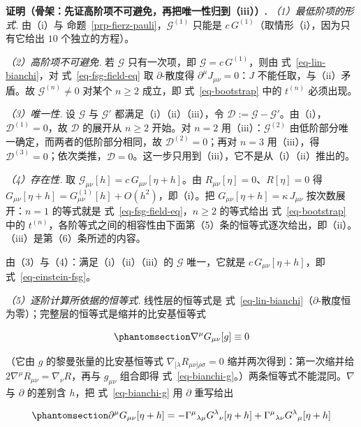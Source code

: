 \documentclass[
  chinese,
  a4paper,
  UTF8,
  12pt,
  oneside,
  openany]{ctexbook}
\theoremstyle{plain}
\theoremstyle{plain}
\theoremstyle{plain}
\theoremstyle{definition}
\theoremstyle{plain}
\theoremstyle{plain}
\theoremstyle{remark}
\begin{document}
\textbf{证明（骨架：先证高阶项不可避免，再把唯一性归到（iii））.}
\emph{（1）最低阶项的形式.} 由（i）与
命题~\ref{prp-fierz-pauli}，\(\mathcal{G}^{(1)}\) 只能是
\(c\,G^{(1)}\)（取情形（i），因为只有它给出 \(10\) 个独立的方程）。

\emph{（2）高阶项不可避免.} 若 \(\mathcal{G}\) 只有一次项，即
\(\mathcal{G}=c\,G^{(1)}\)，则由 式~\ref{eq-lin-bianchi}，对
式~\ref{eq-fsg-field-eq} 取 \(\partial\)-散度得
\(\partial^{\mu}J_{\mu\nu}=0\)：\(J\) 不能任取，与（ii）矛盾。故
\(\mathcal{G}^{(n)}\neq0\) 对某个 \(n\ge2\) 成立，即
式~\ref{eq-bootstrap} 中的 \(t^{(n)}\) 必须出现。

\emph{（3）唯一性.} 设 \(\mathcal{G}\) 与 \(\mathcal{G}'\)
都满足（i）（ii）（iii），令
\(\mathcal{D}:=\mathcal{G}-\mathcal{G}'\)。由（i），\(\mathcal{D}^{(1)}=0\)，故
\(\mathcal{D}\) 的展开从 \(n\ge2\) 开始。对 \(n=2\)
用（iii）：\(\mathcal{G}^{(2)}\)
由低阶部分唯一确定，而两者的低阶部分相同，故
\(\mathcal{D}^{(2)}=0\)；再对 \(n=3\) 用（iii），得
\(\mathcal{D}^{(3)}=0\)；依次类推，\(\mathcal{D}=0\)。这一步只用到（iii），它不是从（i）（ii）推出的。

\emph{（4）存在性.} 取
\(\mathcal{G}_{\mu\nu}[h]=c\,G_{\mu\nu}[\eta+h]\)。由
\(R_{\mu\nu}[\eta]=0\)、\(R[\eta]=0\) 得
\(G_{\mu\nu}[\eta+h]=G^{(1)}_{\mu\nu}[h]+O(h^{2})\)，即（i）。把
\(G_{\mu\nu}[\eta+h]=\kappa\,J_{\mu\nu}\) 按次数展开：\(n=1\) 的等式就是
式~\ref{eq-fsg-field-eq}，\(n\ge2\) 的等式给出 式~\ref{eq-bootstrap}
中的
\(t^{(n)}\)，各阶等式之间的相容性由下面第（5）条的恒等式逐次给出，即（ii）。（iii）是第（6）条所述的内容。

由（3）与（4）：满足（i）（ii）（iii）的 \(\mathcal{G}\) 唯一，它就是
\(c\,G_{\mu\nu}[\eta+h]\)，即 式~\ref{eq-einstein-fsg}。

\emph{（5）逐阶计算所依据的恒等式.} 线性层的恒等式是
式~\ref{eq-lin-bianchi}（\(\partial\)-散度恒为零）；完整层的恒等式是缩并的比安基恒等式

\begin{equation}\protect\phantomsection\label{eq-bianchi-g}{
\nabla^{\mu}G_{\mu\nu}[g]\equiv0
}\end{equation}

（它由 \(g\) 的黎曼张量的比安基恒等式
\(\nabla_{[\lambda}R_{\mu\nu]\rho\sigma}=0\) 缩并两次得到：第一次缩并给
\(2\nabla^{\mu}R_{\mu\nu}=\nabla_{\nu}R\)，再与 \(g_{\mu\nu}\) 组合即得
式~\ref{eq-bianchi-g}。）两条恒等式不能混同。\(\nabla\) 与 \(\partial\)
的差别含 \(h\)，把 式~\ref{eq-bianchi-g} 用 \(\partial\) 重写给出

\begin{equation}\protect\phantomsection\label{eq-partial-divergence}{
\partial^{\mu}G_{\mu\nu}[\eta+h]
=-\Gamma^{\mu}{}_{\lambda\mu}G^{\lambda}{}_{\nu}[\eta+h]
+\Gamma^{\mu}{}_{\lambda\nu}G^{\lambda}{}_{\mu}[\eta+h]
}\end{equation}
\end{document}
